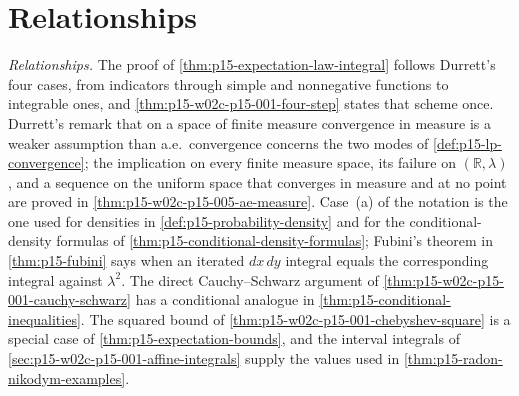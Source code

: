 \section{Relationships}
\label{sec:p15-w02c-p15-001-relationships}

\emph{Relationships.} The proof of
\cref{thm:p15-expectation-law-integral} follows Durrett's four cases,
from indicators through simple and nonnegative functions to integrable
ones, and \cref{thm:p15-w02c-p15-001-four-step} states that scheme once.
Durrett's remark that on a space of finite measure convergence in measure
is a weaker assumption than a.e.\ convergence
\cite[sec.~1.5, p.~26]{DurrettPTEAuthor2019} concerns the two modes of
\cref{def:p15-lp-convergence}; the implication on every finite measure
space, its failure on \((\mathbb R,\lambda)\), and a sequence on the
uniform space that converges in measure and at no point are proved in
\cref{thm:p15-w02c-p15-005-ae-measure}. Case~(a) of the
notation is the one used for densities in
\cref{def:p15-probability-density} and for the conditional-density
formulas of \cref{thm:p15-conditional-density-formulas}; Fubini's
theorem in \cref{thm:p15-fubini} says when an iterated \(dx\,dy\)
integral equals the corresponding integral against \(\lambda^2\). The direct
Cauchy--Schwarz argument of \cref{thm:p15-w02c-p15-001-cauchy-schwarz}
has a conditional analogue in \cref{thm:p15-conditional-inequalities}.
The squared bound of \cref{thm:p15-w02c-p15-001-chebyshev-square} is a
special case of \cref{thm:p15-expectation-bounds}, and the interval
integrals of \cref{sec:p15-w02c-p15-001-affine-integrals} supply the
values used in \cref{thm:p15-radon-nikodym-examples}.

